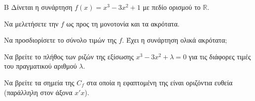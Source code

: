 \begin{thema}{Β}
Δίνεται η συνάρτηση $f(x) = x^3 - 3x^2 + 1$ με πεδίο ορισμού το $\mathbb{R}$.
\begin{erwthma}
  \item Να μελετήσετε την $f$ ως προς τη μονοτονία και τα ακρότατα.
  \item Να προσδιορίσετε το σύνολο τιμών της $f$. Έχει η συνάρτηση ολικά ακρότατα;
  \item Να βρείτε το πλήθος των ριζών της εξίσωσης $x^3 - 3x^2 + \lambda = 0$ για τις διάφορες τιμές του πραγματικού αριθμού $\lambda$.
  \item Να βρείτε τα σημεία της $C_f$ στα οποία η εφαπτομένη της είναι οριζόντια ευθεία (παράλληλη στον άξονα $x'x$).
\end{erwthma}
\end{thema}
